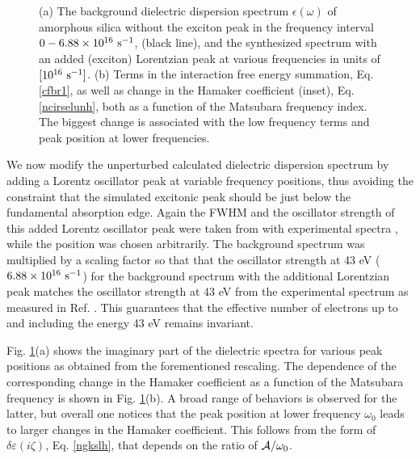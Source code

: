 \documentclass[letterpaper,twocolumn,amsmath,amssymb,floatfix,aps,superscriptaddress]{revtex4}
\begin{document}
\begin{figure}[t!]
\begin{center}
\caption{(a) The background dielectric dispersion spectrum $\epsilon(\omega)$ of amorphous silica without the exciton peak in the frequency interval $\rm 0 - 6.88 \times 10^{16}~s^{-1}$, (black line), and the synthesized spectrum with an added (exciton) Lorentzian peak at various frequencies in units of $\rm [10^{16} ~s^{-1}]$. (b) Terms in the interaction free energy summation, Eq. \ref{cfbr1}, as well as change in the Hamaker coefficient (inset), Eq. \ref{ncirselunh},  both as a function of the Matsubara frequency index. The biggest change is associated with the low frequency terms and peak position at lower frequencies.}
\label{fiddle4}
\end{center}
\end{figure} 

We now modify the unperturbed calculated dielectric dispersion spectrum by adding a Lorentz oscillator peak at variable frequency positions, thus avoiding the constraint that the simulated excitonic peak should be just below the fundamental absorption edge. Again the FWHM and the oscillator strength of this added Lorentz oscillator peak were taken from with experimental spectra \cite{Tan}, while the position was chosen arbitrarily. The background spectrum was multiplied by a scaling factor so that that the oscillator strength at 43 eV ($\rm 6.88 \times 10^{16}~s^{-1}$) for the background spectrum with the additional Lorentzian peak matches the oscillator strength at 43 eV from the experimental spectrum as measured in Ref. \cite{Tan}. This guarantees that the effective number of electrons up to and including the energy 43 eV remains invariant. 

Fig. \ref{fiddle4}(a)  shows the imaginary part of the dielectric spectra for various peak positions as obtained from the forementioned rescaling. The dependence of the corresponding change in the Hamaker coefficient as a function of the Matsubara frequency is shown in Fig. \ref{fiddle4}(b). A broad range of behaviors is observed for the latter, but overall one notices that the peak position at lower frequency $\omega_0$ leads to larger changes in the Hamaker coefficient. This follows from the form of $\delta \varepsilon(i \zeta)$, Eq. \ref{ngkslh}, that depends on the ratio of ${\cal A}/\omega_0$.
\end{document}
